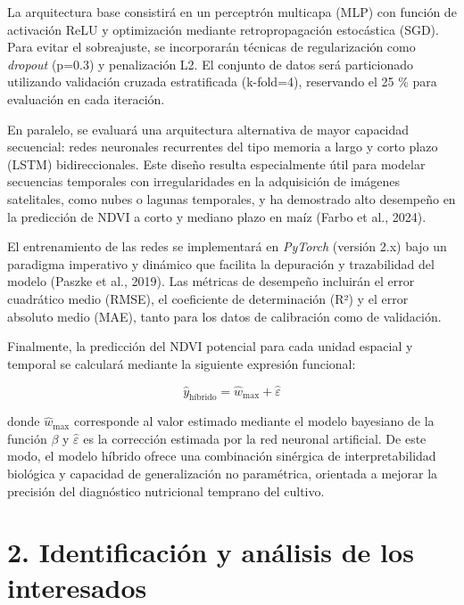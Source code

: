 \documentclass[
11pt, %
]{charter}
\begin{document}
La arquitectura base consistirá en un perceptrón multicapa (MLP) con función de activación ReLU y optimización mediante retropropagación estocástica (SGD). Para evitar el sobreajuste, se incorporarán técnicas de regularización como \textit{dropout} (p=0.3) y penalización L2. El conjunto de datos será particionado utilizando validación cruzada estratificada (k-fold=4), reservando el 25 \% para evaluación en cada iteración. 

En paralelo, se evaluará una arquitectura alternativa de mayor capacidad secuencial: redes neuronales recurrentes del tipo memoria a largo y corto plazo (LSTM) bidireccionales. Este diseño resulta especialmente útil para modelar secuencias temporales con irregularidades en la adquisición de imágenes satelitales, como nubes o lagunas temporales, y ha demostrado alto desempeño en la predicción de NDVI a corto y mediano plazo en maíz (Farbo et al., 2024).

El entrenamiento de las redes se implementará en \textit{PyTorch} (versión 2.x) bajo un paradigma imperativo y dinámico que facilita la depuración y trazabilidad del modelo (Paszke et al., 2019). Las métricas de desempeño incluirán el error cuadrático medio (RMSE), el coeficiente de determinación (R²) y el error absoluto medio (MAE), tanto para los datos de calibración como de validación.

Finalmente, la predicción del NDVI potencial para cada unidad espacial y temporal se calculará mediante la siguiente expresión funcional:

\begin{equation}
\hat{y}_{\text{híbrido}} = \hat{w}_{\max} + \hat{\varepsilon}
\end{equation}

\noindent
donde \( \hat{w}_{\max} \) corresponde al valor estimado mediante el modelo bayesiano de la función $\beta$ y \( \hat{\varepsilon} \) es la corrección estimada por la red neuronal artificial. De este modo, el modelo híbrido ofrece una combinación sinérgica de interpretabilidad biológica y capacidad de generalización no paramétrica, orientada a mejorar la precisión del diagnóstico nutricional temprano del cultivo.


\section{2. Identificación y análisis de los interesados}
\label{sec:interesados}
\end{document}
